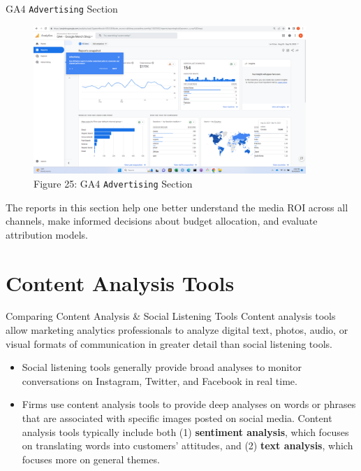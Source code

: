 \documentclass[pdf]{beamer}
\newcommand{\empr}[1]{{\color{franklinblue}\textbf{#1}}}
\theoremstyle{remark}
\theoremstyle{definition}
\begin{document}
\begin{frame}[t]{GA4 \texttt{Advertising} Section}
\begin{figure}[htbp]
  \captionsetup{justification=centering}
  \includegraphics[height=5.6cm, trim=1.5cm 0.0cm 2.0cm 0.0cm width=5.6cm]{Images/G4A_6f_091923_Advertising.png}
  \caption{Figure {\color{franklinblue} 25}: GA4 \texttt{Advertising} Section}
\end{figure}
\vspace{-2.0ex}
\small 
The reports in this section help one better understand the media ROI across all channels, make informed decisions about budget allocation, and evaluate attribution models.
\end{frame}

\section{Content Analysis Tools}

\begin{frame}[t]{Comparing Content Analysis \& Social Listening Tools}
Content analysis tools allow marketing analytics professionals to analyze digital text, photos, audio, or visual formats of communication in greater detail than social listening tools. \\
\vspace{1.5ex}
\begin{itemize}
\item Social listening tools generally provide broad analyses to monitor conversations on Instagram, Twitter, and Facebook in real time. 
\item Firms use content analysis tools to provide deep analyses on words or phrases that are associated with specific images posted on social media. Content analysis tools typically include both (1) \empr{sentiment analysis}, which focuses on translating words into customers' attitudes, and (2) \empr{text analysis}, which focuses more on general themes.
\end{itemize}
\end{frame}
\end{document}
